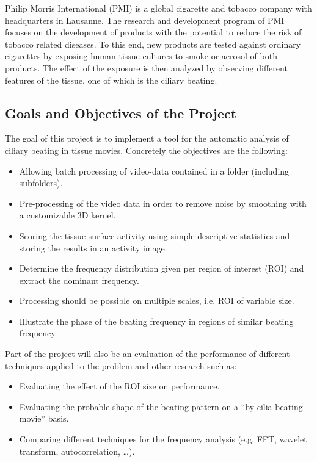 \documentclass[11pt]{scrartcl}
\begin{document}
Philip Morris International (PMI) is a global cigarette and tobacco company with headquarters in Lausanne. The
research and development program of PMI focuses on the development of products with the potential to reduce
the risk of tobacco related diseases. To this end, new products are tested against ordinary cigarettes by
exposing human tissue cultures to smoke or aerosol of both products. The effect of the exposure is then
analyzed by observing different features of the tissue, one of which is the ciliary beating.


\subsection{Goals and Objectives of the Project}

The goal of this project is to implement a tool for the automatic analysis of ciliary beating in tissue
movies. Concretely the objectives are the following:
\begin{itemize}
\item Allowing batch processing of video-data contained in a folder (including subfolders). 
\item Pre-processing of the video data in order to remove noise by smoothing with a customizable 3D kernel.
\item Scoring the tissue surface activity using simple descriptive statistics and storing the results in an
  activity image.
\item Determine the frequency distribution given per region of interest (ROI) and extract the
  dominant frequency.
\item Processing should be possible on multiple scales, i.e. ROI of variable size. 
\item Illustrate the phase of the beating frequency in regions of similar beating frequency.
\end{itemize}

Part of the project will also be an evaluation of the performance of different techniques applied to the
problem and other research such as:

\begin{itemize}
\item Evaluating the effect of the ROI size on performance.
\item Evaluating the probable shape of the beating pattern on a “by cilia beating movie” basis.
\item Comparing different techniques for the frequency analysis (e.g. FFT, wavelet transform, autocorrelation, …).
\end{itemize}
\end{document}
